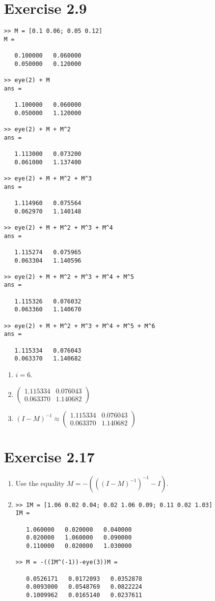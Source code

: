 \documentclass{article}
\begin{document}
\section*{Exercise 2.9}
\begin{lstlisting}
>> M = [0.1 0.06; 0.05 0.12]
M =

   0.100000   0.060000
   0.050000   0.120000

>> eye(2) + M
ans =

   1.100000   0.060000
   0.050000   1.120000

>> eye(2) + M + M^2
ans =

   1.113000   0.073200
   0.061000   1.137400

>> eye(2) + M + M^2 + M^3
ans =

   1.114960   0.075564
   0.062970   1.140148

>> eye(2) + M + M^2 + M^3 + M^4
ans =

   1.115274   0.075965
   0.063304   1.140596

>> eye(2) + M + M^2 + M^3 + M^4 + M^5
ans =

   1.115326   0.076032
   0.063360   1.140670

>> eye(2) + M + M^2 + M^3 + M^4 + M^5 + M^6
ans =

   1.115334   0.076043
   0.063370   1.140682
\end{lstlisting}
\begin{enumerate}[label=(\alph*)]
\item $i=6$. 
\item \(
    \begin{pmatrix}
   1.115334 &   0.076043 \\
   0.063370  & 1.140682
    \end{pmatrix}
\)
\item $(I-M)^{-1} \approx     \begin{pmatrix}
   1.115334 &   0.076043 \\
   0.063370  & 1.140682
    \end{pmatrix}$
\end{enumerate}

\section*{Exercise 2.17}
\begin{enumerate}[label=(\alph*)]
\item Use the equality $M = - (((I-M)^{-1})^{-1}-I)$.
\item
\begin{lstlisting}
>> IM = [1.06 0.02 0.04; 0.02 1.06 0.09; 0.11 0.02 1.03]
IM =

   1.060000   0.020000   0.040000
   0.020000   1.060000   0.090000
   0.110000   0.020000   1.030000

>> M = -((IM^(-1))-eye(3))M =

   0.0526171   0.0172093   0.0352878
   0.0093000   0.0548769   0.0822224
   0.1009962   0.0165140   0.0237611
\end{lstlisting}
\end{enumerate}
\end{document}
